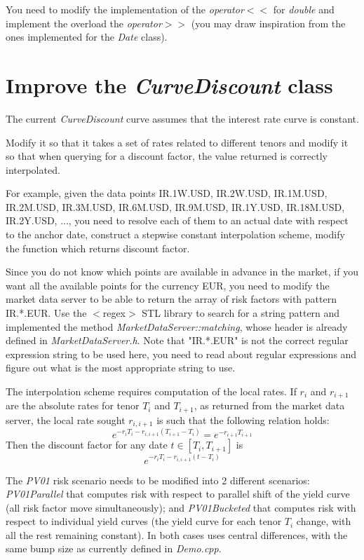 \documentclass[10pt]{article}
\begin{document}
You need to modify the implementation of the \textit{operator$<<$} for \textit{double} and implement the overload the \textit{operator$>>$} (you may draw inspiration from the ones implemented for the \textit{Date} class).

\section{Improve the \textit{CurveDiscount} class}
The current \textit{CurveDiscount} curve assumes that the interest rate curve is constant.

Modify it so that it takes a set of rates related to different tenors and modify it so that when querying for a discount factor, the value returned is correctly interpolated.

For example, given the data points {IR.1W.USD, IR.2W.USD, IR.1M.USD, IR.2M.USD, IR.3M.USD, IR.6M.USD, IR.9M.USD, IR.1Y.USD, IR.18M.USD, IR.2Y.USD, ...}, you need to resolve each of them to an actual date with respect to the anchor date, construct a stepwise constant interpolation scheme, modify the function which returns discount factor.

Since you do not know which points are available in advance in the market, if you want all the available points for the currency EUR, you need to modify the market data server to be able to return the array of risk factors with pattern IR.*.EUR. Use the $<$regex$>$ STL library to search for a string pattern and implemented the method \textit{MarketDataServer::matching}, whose header is already defined in \textit{MarketDataServer.h}. Note that "IR.*.EUR" is not the correct regular expression string to be used here, you need to read about regular expressions and figure out what is the most appropriate string to use.

The interpolation scheme requires computation of the local rates. If $r_i$ and $r_{i+1}$ are the absolute rates for tenor $T_i$ and $T_{i+1}$, as returned from the market data server, the local rate sought $r_{i,i+1}$ is such that the following relation holds:
 $$e^{-r_iT_i-r_{i,i+1}(T_{i+1}-T_i)}=e^{-r_{i+1}T_{i+1}}$$
Then the discount factor for any date $t \in [T_i,T_{i+1}]$ is $$e^{-r_i T_i-r_{i,i+1}(t-T_i)}$$

The \textit{PV01} risk scenario needs to be modified into 2 different scenarios: \textit{PV01Parallel} that computes risk with respect to parallel shift of the yield curve (all risk factor move simultaneously); and \textit{PV01Bucketed} that computes risk with respect to individual yield curves (the yield curve for each tenor $T_i$ change, with all the rest remaining constant). In both cases uses central differences, with the same bump size as currently defined in \textit{Demo.cpp}.\\
\end{document}
